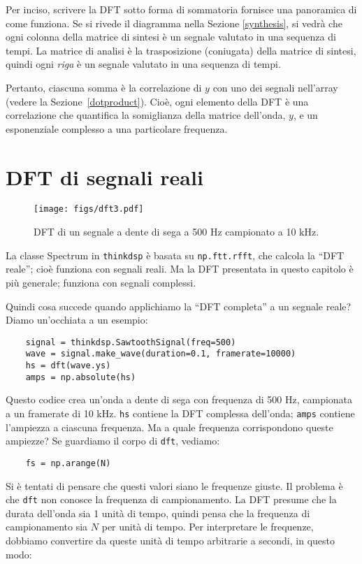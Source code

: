 \documentclass[12pt,a4paper]{book}
\begin{document}
Per inciso, scrivere la DFT sotto forma di sommatoria fornisce una panoramica di come funziona. Se si rivede il diagramma nella Sezione \ref{synthesis}, si vedrà che ogni colonna della matrice di sintesi è un segnale valutato in una sequenza di tempi. La matrice di analisi è la trasposizione (coniugata) della matrice di sintesi, quindi ogni {\em riga} è un segnale valutato in una sequenza di tempi.

Pertanto, ciascuna somma è la correlazione di $y$ con uno dei segnali nell'array (vedere la Sezione~\ref{dotproduct}). Cioè, ogni elemento della DFT è una correlazione che quantifica la somiglianza della matrice dell'onda, $y$, e un esponenziale complesso a una particolare frequenza.

\section{DFT di segnali reali} 

\begin{figure} 

\centerline{\texttt{[image: figs/dft3.pdf]}} \caption{DFT di un segnale a dente di sega a 500 Hz campionato a 10 kHz.} \label{fig.dft3} \end{figure} 

La classe Spectrum in {\tt thinkdsp} è basata su {\tt np.ftt.rfft}, che calcola la ``DFT reale''; cioè funziona con segnali reali. Ma la DFT presentata in questo capitolo è più generale; funziona con segnali complessi.

Quindi cosa succede quando applichiamo la ``DFT completa'' a un segnale reale? Diamo un'occhiata a un esempio:

\begin{verbatim} 
    signal = thinkdsp.SawtoothSignal(freq=500)
    wave = signal.make_wave(duration=0.1, framerate=10000)
    hs = dft(wave.ys)
    amps = np.absolute(hs)
 \end{verbatim} 

Questo codice crea un'onda a dente di sega con frequenza di 500 Hz, campionata a un framerate di 10 kHz. {\tt hs} contiene la DFT complessa dell'onda; {\tt amps} contiene l'ampiezza a ciascuna frequenza. Ma a quale frequenza corrispondono queste ampiezze? Se guardiamo il corpo di {\tt dft}, vediamo:

\begin{verbatim} 
    fs = np.arange(N)
 \end{verbatim} 

Si è tentati di pensare che questi valori siano le frequenze giuste. Il problema è che {\tt dft} non conosce la frequenza di campionamento. La DFT presume che la durata dell'onda sia 1 unità di tempo, quindi pensa che la frequenza di campionamento sia $N$ per unità di tempo. Per interpretare le frequenze, dobbiamo convertire da queste unità di tempo arbitrarie a secondi, in questo modo:
\end{document}
